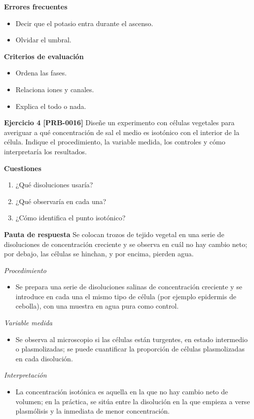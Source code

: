 \documentclass{book}
\begin{document}
\noindent\textbf{Errores frecuentes}
\begin{itemize}
\item Decir que el potasio entra durante el ascenso.
\item Olvidar el umbral.
\end{itemize}

\noindent\textbf{Criterios de evaluación}
\begin{itemize}
\item Ordena las fases.
\item Relaciona iones y canales.
\item Explica el todo o nada.
\end{itemize}

\noindent\textbf{Ejercicio 4 [PRB-0016]}
Diseñe un experimento con células vegetales para averiguar a qué concentración de sal el medio es isotónico con el interior de la célula. Indique el procedimiento, la variable medida, los controles y cómo interpretaría los resultados.


\noindent\textbf{Cuestiones}
\begin{enumerate}
\item ¿Qué disoluciones usaría?
\item ¿Qué observaría en cada una?
\item ¿Cómo identifica el punto isotónico?
\end{enumerate}

\noindent\textbf{Pauta de respuesta}
Se colocan trozos de tejido vegetal en una serie de disoluciones de concentración creciente y se observa en cuál no hay cambio neto; por debajo, las células se hinchan, y por encima, pierden agua.


\noindent\textit{Procedimiento}
\begin{itemize}
\item Se prepara una serie de disoluciones salinas de concentración creciente y se introduce en cada una el mismo tipo de célula (por ejemplo epidermis de cebolla), con una muestra en agua pura como control.
\end{itemize}

\noindent\textit{Variable medida}
\begin{itemize}
\item Se observa al microscopio si las células están turgentes, en estado intermedio o plasmolizadas; se puede cuantificar la proporción de células plasmolizadas en cada disolución.
\end{itemize}

\noindent\textit{Interpretación}
\begin{itemize}
\item La concentración isotónica es aquella en la que no hay cambio neto de volumen; en la práctica, se sitúa entre la disolución en la que empieza a verse plasmólisis y la inmediata de menor concentración.
\end{itemize}
\end{document}
